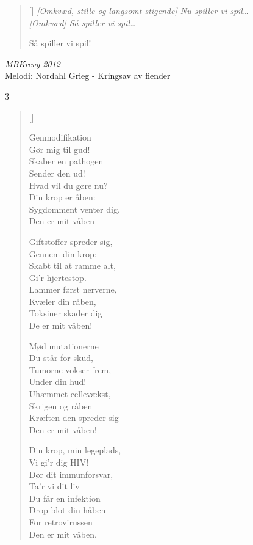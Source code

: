 {\begin{multicols}
\begin{verse}[\versewidth]
\emph{[Omkvæd, stille og langsomt stigende]
Nu spiller vi spil\ldots}\\
\emph{[Omkvæd] Så spiller vi spil\ldots}

Så spiller vi spil!
\end{verse}
\end{multicols}

{\small\itshape MBKrevy 2012}\\[.2em]
{Melodi: Nordahl Grieg - Kringsav av fiender}
\begin{multicols}3
\settowidth{\versewidth}{Din krop, min legeplads,}
\begin{verse}[\versewidth]

Genmodifikation\\
Gør mig til gud!\\
Skaber en pathogen\\
Sender den ud!\\
Hvad vil du gøre nu?\\
Din krop er åben:\\
Sygdomment venter dig,\\
Den er mit våben

Giftstoffer spreder sig,\\
Gennem din krop:\\
Skabt til at ramme alt,\\
Gi'r hjertestop.\\
Lammer først nerverne,\\
Kvæler din råben,\\
Toksiner skader dig\\
De er mit våben!

Mød mutationerne\\
Du står for skud,\\
Tumorne vokser frem,\\
Under din hud!\\
Uhæmmet cellevækst,\\
Skrigen og råben\\
Kræften den spreder sig\\
Den er mit våben!

Din krop, min legeplads,\\
Vi gi'r dig HIV!\\
Dør dit immunforsvar,\\
Ta'r vi dit liv\\
Du får en infektion\\
Drop blot din håben\\
For retrovirussen\\
Den er mit våben.


\end{verse}
\end{multicols}}
